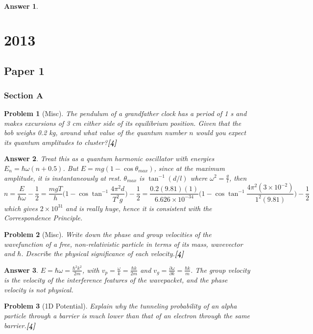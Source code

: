 \documentclass[a4paper]{article}
\newtheorem{ans}{Answer}[subsection]
\theoremstyle{new}
\newtheorem{qns}{Problem}[subsection]
\begin{document}
\begin{ans}
\end{ans}
\newpage
\section{2013}
\subsection{Paper 1}
\subsubsection{Section A}
\begin{qns}[Misc]
The pendulum of a grandfather clock has a period of 1 s and makes excursions of 3 cm either side of its equilibrium position. Given that the bob weighs 0.2 kg, around what value of the quantum number $n$ would you expect its quantum amplitudes to cluster?\hfill\textbf{[4]}
\end{qns}
\begin{ans}
Treat this as a quantum harmonic oscillator with energies $E_n=\hbar\omega(n+0.5)$. But $E=mg(1-\cos\theta_{max})$, since at the maximum amplitude, it is instantaneously at rest. $\theta_{max}$ is $\tan^{-1}(d/l)$ where $\omega^2=\frac{g}{l}$, then
$$n=\frac{E}{\hbar\omega}-\frac{1}{2}=\frac{mgT}{h}\bigg(1-\cos\tan^{-1}\frac{4\pi^2d}{T^2g}\bigg)-\frac{1}{2}=\frac{0.2(9.81)(1)}{6.626\times10^{-34}}\bigg(1-\cos\tan^{-1}\frac{4\pi^2(3\times10^{-2})}{1^2(9.81)}\bigg)-\frac{1}{2}$$
which gives $2\times10^{31}$ and is really huge, hence it is consistent with the Correspondence Principle.
\end{ans}
\begin{qns}[Misc]
Write down the phase and group velocities of the wavefunction of a free, non-relativistic particle in terms of its mass, wavevector and $\hbar$. Describe the physical significance of each velocity.\hfill\textbf{[4]}
\end{qns}
\begin{ans}
$E=\hbar\omega=\frac{\hbar^2k^2}{2m}$, with $v_p=\frac{\omega}{k}=\frac{\hbar k}{2m}$ and $v_g=\frac{\partial\omega}{\partial k}=\frac{\hbar k}{m}$. The group velocity is the velocity of the interference features of the wavepacket, and the phase velocity is not physical.
\end{ans}
\begin{qns}[1D Potential]
Explain why the tunneling probability of an alpha particle through a barrier is much lower than that of an electron through the same barrier.\hfill\textbf{[4]}
\end{qns}
\end{document}
